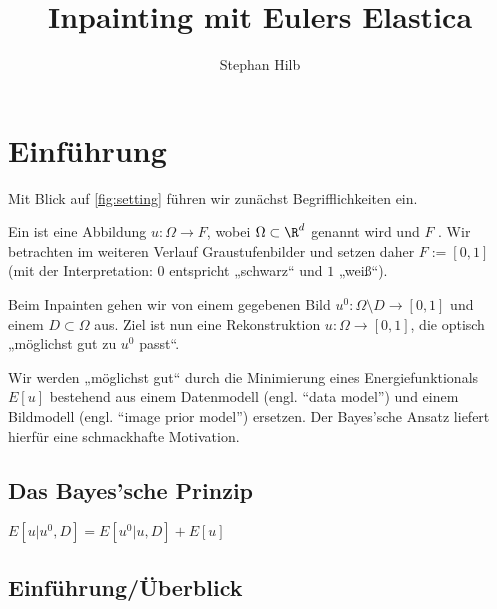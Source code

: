 \documentclass{mythesis}
\title{Inpainting mit Eulers Elastica}
\author{Stephan Hilb}
\begin{document}


\chapter{Einführung}


Mit Blick auf \ref{fig:setting} führen wir zunächst Begrifflichkeiten ein.


\begin{definition} \label{def:image}
    Ein  ist eine Abbildung $u: \Omega \to F$, wobei $\Omega \subset \R^d$
     genannt wird und $F$ .
    Wir betrachten im weiteren Verlauf Graustufenbilder und setzen daher $F := [0,1]$ (mit der
    Interpretation: $0$ entspricht „schwarz“ und $1$ „weiß“).
\end{definition}

Beim Inpainten gehen wir von einem gegebenen Bild $u^0: \Omega \setminus D \to [0,1]$ und einem 
$D \subset \Omega$ aus. Ziel ist nun eine Rekonstruktion $u: \Omega \to [0,1]$, die optisch „möglichst gut zu $u^0$ passt“.

Wir werden „möglichst gut“ durch die Minimierung eines Energiefunktionals $E[u]$ bestehend aus einem Datenmodell (engl. “data model”) und einem Bildmodell (engl. “image prior model”) ersetzen.
Der Bayes'sche Ansatz liefert hierfür eine schmackhafte Motivation.

\section{Das Bayes'sche Prinzip}


\begin{math}
    E[u|u^0, D] = E[u^0|u,D] + E[u]
\end{math}







\section{Einführung/Überblick}
\end{document}
